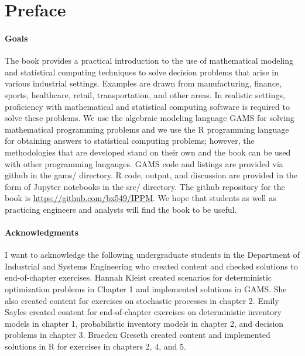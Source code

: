 \documentclass[11pt]{report}
\begin{document}
\tableofcontents
\chapter*{Preface}

\subsubsection*{Goals} 

The book provides a practical introduction to the use of mathematical
modeling and statistical computing techniques to solve decision
problems that arise in various industrial settings. Examples are drawn
from manufacturing, finance, sports, healthcare, retail,
transportation, and other areas. In realistic settings, proficiency
with mathematical and statistical computing software is required to
solve these problems. We use the algebraic modeling language GAMS for
solving mathematical programming problems and we use the R programming
language for obtaining answers to statistical computing problems;
however, the methodologies that are developed stand on their own and
the book can be used with other programming langauges. GAMS code and
listings are provided via github in the gams/ directory. R code,
output, and discussion are provided in the form of Jupyter notebooks
in the src/ directory. The github repository for the book is
\url{https://github.com/bx549/IPPM}.  We hope that students as well as
practicing engineers and analysts will find the book to be useful.

\subsubsection*{Acknowledgments}

I want to acknowledge the following undergraduate students in the
Department of Industrial and Systems Engineering who created content
and checked solutions to end-of-chapter exercises.  Hannah Kleist
created scenarios for deterministic optimization problems in Chapter 1
and implemented solutions in GAMS. She also created content for
exercises on stochastic processes in chapter 2. Emily Sayles created
content for end-of-chapter exercises on deterministic inventory models
in chapter 1, probabilistic inventory models in chapter 2, and
decision problems in chapter 3. Braeden Greseth created content and
implemented solutions in R for exercises in chapters 2, 4, and 5.








\printbibliography[heading=bibintoc,title={References}]
\end{document}
